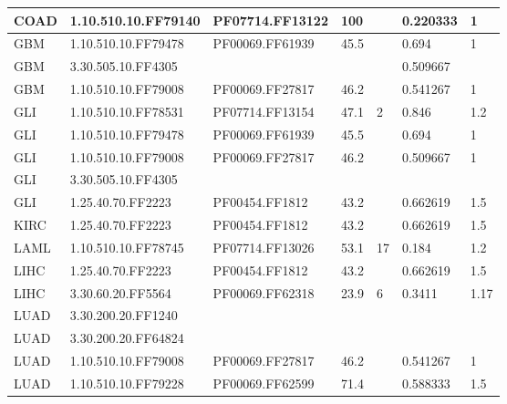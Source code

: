 \documentclass[a4paper, 11pt]{report}
\begin{document}
\begin{table}[!htbp]
\begin{tabular}{|l|l|l|l|l|l|l|}
COAD         & 1.10.510.10.FF79140  & PF07714.FF13122 & 100       &             & 0.220333          & 1        \\ \hline
GBM          & 1.10.510.10.FF79478  & PF00069.FF61939 & 45.5      &             & 0.694             & 1        \\ \hline
GBM          & 3.30.505.10.FF4305   &                 &           &             & 0.509667          &          \\ \hline
GBM          & 1.10.510.10.FF79008  & PF00069.FF27817 & 46.2      &             & 0.541267          & 1        \\ \hline
GLI          & 1.10.510.10.FF78531  & PF07714.FF13154 & 47.1      & 2           & 0.846             & 1.2      \\ \hline
GLI          & 1.10.510.10.FF79478  & PF00069.FF61939 & 45.5      &             & 0.694             & 1        \\ \hline
GLI          & 1.10.510.10.FF79008  & PF00069.FF27817 & 46.2      &             & 0.509667          & 1        \\ \hline
GLI          & 3.30.505.10.FF4305   &                 &           &             &                   &          \\ \hline
GLI          & 1.25.40.70.FF2223    & PF00454.FF1812  & 43.2      &             & 0.662619          & 1.5      \\ \hline
KIRC         & 1.25.40.70.FF2223    & PF00454.FF1812  & 43.2      &             & 0.662619          & 1.5      \\ \hline
LAML         & 1.10.510.10.FF78745  & PF07714.FF13026 & 53.1      & 17          & 0.184             & 1.2      \\ \hline
LIHC         & 1.25.40.70.FF2223    & PF00454.FF1812  & 43.2      &             & 0.662619          & 1.5      \\ \hline
LIHC         & 3.30.60.20.FF5564    & PF00069.FF62318 & 23.9      & 6           & 0.3411            & 1.17     \\ \hline
LUAD         & 3.30.200.20.FF1240   &                 &           &             &                   &          \\ \hline
LUAD         & 3.30.200.20.FF64824  &                 &           &             &                   &          \\ \hline
LUAD         & 1.10.510.10.FF79008  & PF00069.FF27817 & 46.2      &             & 0.541267          & 1        \\ \hline
LUAD         & 1.10.510.10.FF79228  & PF00069.FF62599 & 71.4      &             & 0.588333          & 1.5      \\ \hline

\end{tabular}
\end{table}
\end{document}
